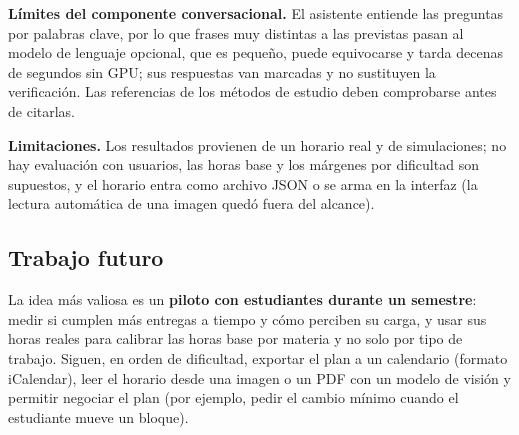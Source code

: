 \textbf{Límites del componente conversacional.} El asistente entiende las preguntas por palabras clave, por lo que frases muy distintas a las previstas pasan al modelo de lenguaje opcional, que es pequeño, puede equivocarse y tarda decenas de segundos sin GPU; sus respuestas van marcadas y no sustituyen la verificación. Las referencias de los métodos de estudio deben comprobarse antes de citarlas.

\textbf{Limitaciones.} Los resultados provienen de un horario real y de simulaciones; no hay evaluación con usuarios, las horas base y los márgenes por dificultad son supuestos, y el horario entra como archivo JSON o se arma en la interfaz (la lectura automática de una imagen quedó fuera del alcance).

\subsection{Trabajo futuro}

La idea más valiosa es un \textbf{piloto con estudiantes durante un semestre}: medir si cumplen más entregas a tiempo y cómo perciben su carga, y usar sus horas reales para calibrar las horas base por materia y no solo por tipo de trabajo. Siguen, en orden de dificultad, exportar el plan a un calendario (formato iCalendar), leer el horario desde una imagen o un PDF con un modelo de visión y permitir negociar el plan (por ejemplo, pedir el cambio mínimo cuando el estudiante mueve un bloque).
